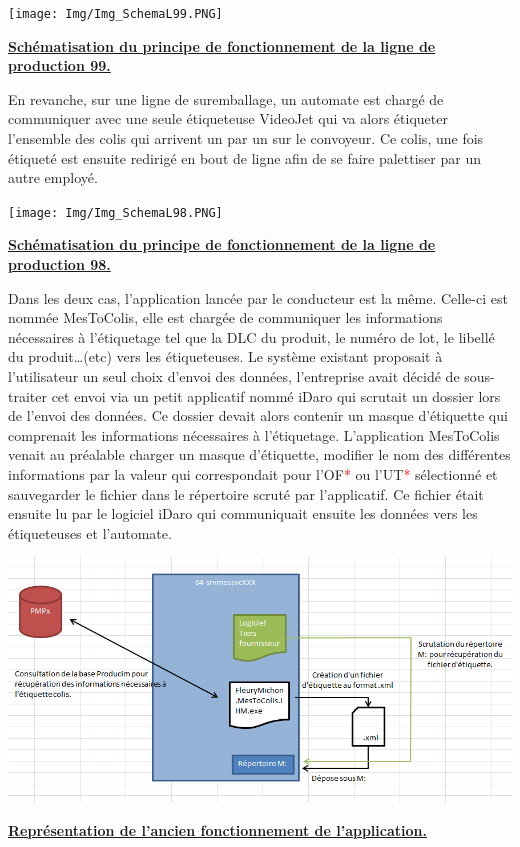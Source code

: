 \documentclass[a4paper,12pt]{extarticle}
\newcommand{\espace}{\vspace{0.3cm}}
\newcommand{\alinea}{\hspace*{0.4cm}}
\begin{document}
\centerline{\texttt{[image: Img/Img\_SchemaL99.PNG]}}
\centerline{\textbf{\underline{Schématisation du principe de fonctionnement de la ligne de production 99.}}}
\espace{}

En revanche, sur une ligne de suremballage, un automate est chargé de communiquer avec une seule étiqueteuse VideoJet qui va alors étiqueter l’ensemble des colis qui arrivent un par un sur le convoyeur. Ce colis, une fois étiqueté est ensuite redirigé en bout de ligne afin de se faire palettiser par un autre employé.\\

\centerline{\texttt{[image: Img/Img\_SchemaL98.PNG]}}
\centerline{\textbf{\underline{Schématisation du principe de fonctionnement de la ligne de production 98.}}}
\espace{}

\alinea
	Dans les deux cas, l’application lancée par le conducteur est la même. Celle-ci est nommée MesToColis, elle est chargée de communiquer les informations nécessaires à l’étiquetage tel que la DLC du produit, le numéro de lot, le libellé du produit…(etc) vers les étiqueteuses. Le système existant proposait à l’utilisateur un seul choix d’envoi des données, l’entreprise avait décidé de sous-traiter cet envoi via un petit applicatif nommé iDaro qui scrutait un dossier lors de l’envoi des données. Ce dossier devait alors contenir un masque d’étiquette qui comprenait les informations nécessaires à l’étiquetage. L’application MesToColis venait au préalable charger un masque d'étiquette, modifier le nom des différentes informations par la valeur qui correspondait pour l’OF\textcolor{red}{*} ou l’UT\textcolor{red}{*} sélectionné et sauvegarder le fichier dans le répertoire scruté par l'applicatif. Ce fichier était ensuite lu par le logiciel iDaro qui communiquait ensuite les données vers les étiqueteuses et l’automate.\\

\centerline{\includegraphics[scale=0.7]{Img/Img_RepresentationiDaro.PNG}}
\centerline{\textbf{\underline{Représentation de l’ancien fonctionnement de l’application.}}}
\espace{}
\end{document}

